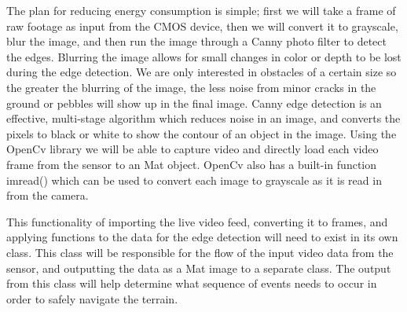 \documentclass[10pt,letterpaper,onecolumn,journal]{IEEEtran}
\begin{document}
\par 
The plan for reducing energy consumption is simple; first we will take a frame of raw footage as input from the CMOS device, then we will convert it to grayscale, blur the image, and then run the image through a Canny photo filter to detect the edges. Blurring the image allows for small changes in color or depth to be lost during the edge detection. We are only interested in obstacles of a certain size so the greater the blurring of the image, the less noise from minor cracks in the ground or pebbles will show up in the final image. Canny edge detection is an effective, multi-stage algorithm which reduces noise in an image, and converts the pixels to black or white to show the contour of an object in the image. Using the OpenCv library we will be able to capture video and directly load each video frame from the sensor to an Mat object. OpenCv also has a built-in function imread() which can be used to convert each image to grayscale as it is read in from the camera. 
\par 
This functionality of importing the live video feed, converting it to frames, and applying functions to the data for the edge detection will need to exist in its own class. This class will be responsible for the flow of the input video data from the sensor, and outputting the data as a Mat image to a separate class. The output from this class will help determine what sequence of events needs to occur in order to safely navigate the terrain.
%
%
\iffalse
\end{document}
